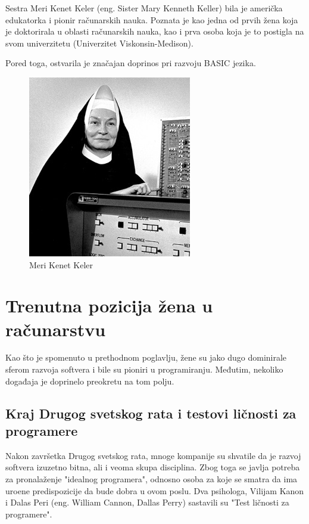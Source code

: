 \documentclass[12pt]{article}
\begin{document}
Sestra Meri Kenet Keler (eng. Sister Mary Kenneth Keller) bila je američka edukatorka i pionir računarskih nauka. Poznata je kao jedna od prvih žena koja je doktorirala u oblasti računarskih nauka, kao i prva osoba koja je to postigla na svom univerzitetu (Univerzitet Viskonsin-Medison).

Pored toga, ostvarila je značajan doprinos pri razvoju BASIC jezika.

\begin{figure}[htp]
    \centering
    \includegraphics[width=0.6\linewidth]{marykenneth.png}
    \caption{Meri Kenet Keler}
\end{figure}

\newpage

\section{Trenutna pozicija žena u računarstvu}

Kao što je spomenuto u prethodnom poglavlju, žene su jako dugo dominirale sferom razvoja softvera i bile su pioniri u programiranju. Međutim, nekoliko događaja je doprinelo preokretu na tom polju.

\subsection{Kraj Drugog svetskog rata i testovi ličnosti za programere}

Nakon završetka Drugog svetskog rata, mnoge kompanije su shvatile da je razvoj softvera izuzetno bitna, ali i veoma skupa disciplina. Zbog toga se javlja potreba za pronalaženje "idealnog programera", odnosno osoba za koje se smatra da ima uro\dj ene predispozicije da bude dobra u ovom poslu. Dva psihologa, Vilijam Kanon i Dalas Peri (eng. William Cannon, Dallas Perry) sastavili su "Test ličnosti za programere". 
\end{document}
